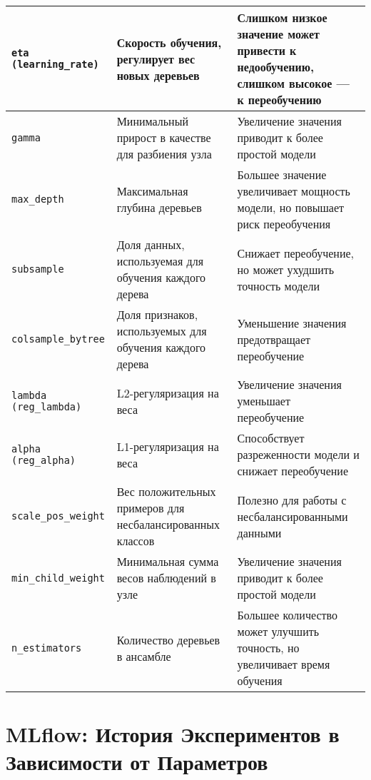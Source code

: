 \documentclass[14pt, a4paper]{src/bsu}
\begin{document}
\begin{longtable}{|p{4cm}|p{6cm}|p{6cm}|}
	\texttt{eta (learning\_rate)}                     & Скорость обучения, регулирует вес новых
	деревьев                                          & Слишком низкое значение может привести к недообучению,
	слишком высокое — к переобучению                                                                                                \\ \hline \texttt{gamma}                &
	Минимальный прирост в качестве для разбиения узла & Увеличение
	значения приводит к более простой модели
	\\ \hline \texttt{max\_depth}           & Максимальная глубина деревьев
	                                                  & Большее значение увеличивает мощность модели, но повышает риск переобучения
	\\ \hline \texttt{subsample}            & Доля данных, используемая для
	обучения каждого дерева                           & Снижает переобучение, но может ухудшить
	точность модели                                                                                                                 \\ \hline
	\texttt{colsample\_bytree}                        & Доля признаков, используемых для обучения
	каждого дерева                                    & Уменьшение значения предотвращает переобучение
	\\ \hline \texttt{lambda (reg\_lambda)} & L2-регуляризация на веса
	                                                  & Увеличение значения уменьшает переобучение
	\\ \hline \texttt{alpha (reg\_alpha)}   & L1-регуляризация на веса
	                                                  & Способствует разреженности модели и снижает переобучение
	\\ \hline \texttt{scale\_pos\_weight}   & Вес положительных примеров для
	несбалансированных классов                        & Полезно для работы с несбалансированными данными
	\\ \hline \texttt{min\_child\_weight}   & Минимальная сумма весов наблюдений
	в узле                                            & Увеличение значения приводит к более простой модели
	\\ \hline \texttt{n\_estimators}        & Количество деревьев в ансамбле
	                                                  & Большее количество может улучшить точность, но увеличивает время обучения
	\\\end{longtable}


\chapter{MLflow: История Экспериментов в Зависимости от Параметров}
\end{document}
